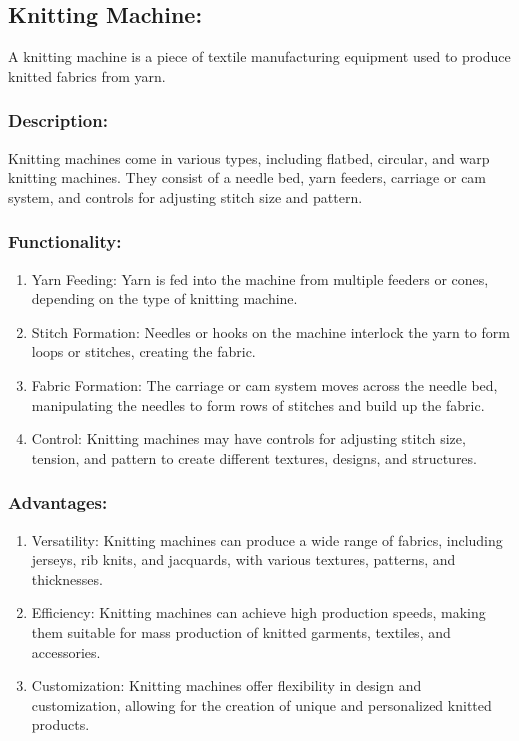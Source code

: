 \subsection{Knitting Machine:}


A knitting machine is a piece of textile manufacturing equipment used to
produce knitted fabrics from yarn.


\subsubsection{Description:}


Knitting machines come in various types, including flatbed, circular,
and warp knitting machines. They consist of a needle bed, yarn feeders,
carriage or cam system, and controls for adjusting stitch size and
pattern.


\subsubsection{Functionality:}

\begin{enumerate}
\item
  Yarn Feeding: Yarn is fed into the machine from multiple feeders or
  cones, depending on the type of knitting machine.
\item
  Stitch Formation: Needles or hooks on the machine interlock the yarn
  to form loops or stitches, creating the fabric.
\item
  Fabric Formation: The carriage or cam system moves across the needle
  bed, manipulating the needles to form rows of stitches and build up
  the fabric.
\item
  Control: Knitting machines may have controls for adjusting stitch
  size, tension, and pattern to create different textures, designs, and
  structures.
\end{enumerate}

\subsubsection{Advantages:}

\begin{enumerate}
\item
  Versatility: Knitting machines can produce a wide range of fabrics,
  including jerseys, rib knits, and jacquards, with various textures,
  patterns, and thicknesses.
\item
  Efficiency: Knitting machines can achieve high production speeds,
  making them suitable for mass production of knitted garments,
  textiles, and accessories.
\item
  Customization: Knitting machines offer flexibility in design and
  customization, allowing for the creation of unique and personalized
  knitted products.
\end{enumerate}

